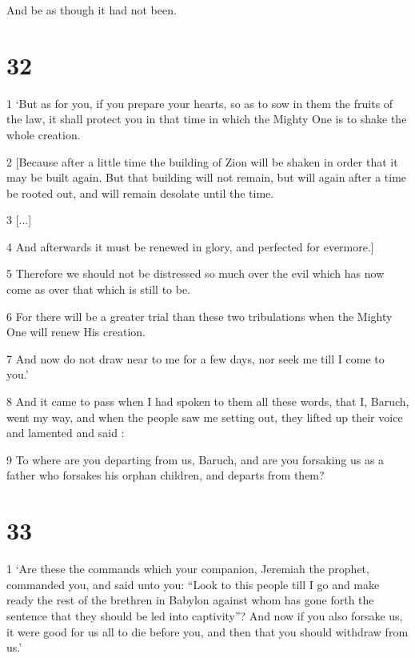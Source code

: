 \par And be as though it had not been.

\chapter{32}

\par 1 ‘But as for you, if you prepare your hearts, so as to sow in them the fruits of the law, it shall protect you in that time in which the Mighty One is to shake the whole creation. 

\par 2 [Because after a little time the building of Zion will be shaken in order that it may be built again. But that building will not remain, but will again after a time be rooted out, and will remain desolate until the time. 

\par 3 [...]

\par 4 And afterwards it must be renewed in glory, and perfected for evermore.] 

\par 5 Therefore we should not be distressed so much over the evil which has now come as over that which is still to be. 

\par 6 For there will be a greater trial than these two tribulations when the Mighty One will renew His creation. 

\par 7 And now do not draw near to me for a few days, nor seek me till I come to you.’

\par 8 And it came to pass when I had spoken to them all these words, that I, Baruch, went my way, and when the people saw me setting out, they lifted up their voice and lamented and said : 

\par 9 To where are you departing from us, Baruch, and are you forsaking us as a father who forsakes his orphan children, and departs from them?

\chapter{33}

\par 1 ‘Are these the commands which your companion, Jeremiah the prophet, commanded you, and said unto you: “Look to this people till I go and make ready the rest of the brethren in Babylon against whom has gone forth the sentence that they should be led into captivity”? And now if you also forsake us, it were good for us all to die before you, and then that you should withdraw from us.’

